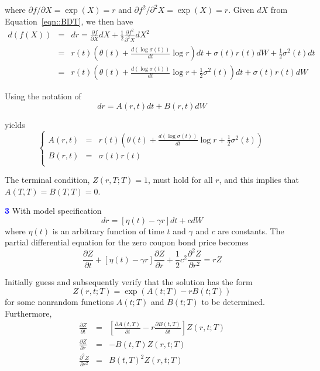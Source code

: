 \documentclass[a4paper,11pt] {article}
\begin{document}
where $\partial f / \partial X = \exp(X) = r$ and $\partial f^2 / \partial^2 X = \exp(X) = r$. Given $dX$ from Equation~\ref{eqn::BDT}, we then have
\begin{eqnarray*}
d(f(X)) &=& dr =  \frac{\partial f}{\partial X} dX + \frac{1}{2} \frac{\partial f^2}{\partial^2 X} dX^2 \\
        &=& r(t)\left( \theta(t) + \frac{d(\log\sigma(t))}{dt} \log r \right) dt + \sigma(t)r(t) dW + \frac{1}{2}\sigma^2(t) dt \\
        &=& r(t)\left( \theta(t) + \frac{d(\log\sigma(t))}{dt} \log r + \frac{1}{2} \sigma^2(t) \right) dt + \sigma(t)r(t) dW
\end{eqnarray*}

Using the notation of
$$
dr = A(r,t)dt + B(r,t)dW
$$

yields
$$
\left\{
  \begin{array}{ccl}
    A(r,t) & = & r(t)\left( \theta(t) + \frac{d(\log\sigma(t))}{dt} \log r + \frac{1}{2} \sigma^2(t) \right) \\
    B(r,t) & = & \sigma(t)r(t) \\
  \end{array}
\right.
$$

The terminal condition, $Z(r,T;T)=1$, must hold for all $r$, and this implies that $A(T,T)=B(T,T)=0$.

\bigskip

\textcolor{blue}{\bf 3 } With model specification
$$
dr = [\eta(t)-\gamma r] dt + c dW
$$
where $\eta(t)$ is an arbitrary function of time $t$ and $\gamma$ and $c$ are constants. The partial differential
equation for the zero coupon bond price becomes
\begin{equation} \label{eqn::bond_hw}
\frac{\partial Z}{\partial t} + [\eta(t)-\gamma r]\frac{\partial Z}{\partial r} + \frac{1}{2}c^2 \frac{\partial^2 Z}{\partial r^2} = rZ
\end{equation}

Initially guess and subsequently verify that the solution has the form
$$
Z(r,t;T) = \exp(A(t;T)-rB(t;T))
$$
for some nonrandom functions $A(t;T)$ and $B(t;T)$ to be determined. Furthermore,
\begin{eqnarray*}
\frac{\partial Z}{\partial t}       &=& \left[\frac{\partial A(t,T)}{\partial t} - r\frac{\partial B(t,T)}{\partial t}\right]Z(r,t;T) \\
\frac{\partial Z}{\partial r}       &=& -B(t,T)Z(r,t;T) \\
\frac{\partial^2 Z}{\partial r^2}   &=& B(t,T)^2 Z(r,t;T)
\end{eqnarray*}
\end{document}
